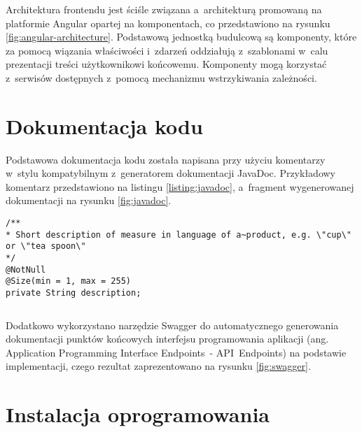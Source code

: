 
Architektura frontendu jest ściśle związana a~architekturą promowaną na platformie Angular opartej na komponentach,
co przedstawiono na rysunku \ref{fig:angular-architecture}.
Podstawową jednostką budulcową są komponenty, które za pomocą wiązania właściwości i~zdarzeń oddziałują z~szablonami w~calu prezentacji treści użytkownikowi końcowemu.
Komponenty mogą korzystać z~serwisów dostępnych z~pomocą mechanizmu wstrzykiwania zależności.

\section{Dokumentacja kodu}\label{sec:code-documentation}

Podstawowa dokumentacja kodu została napisana przy użyciu komentarzy w~stylu kompatybilnym z~generatorem dokumentacji JavaDoc\cite{tech:javadoc}.
Przykładowy komentarz przedstawiono na listingu \ref{listing:javadoc}, a~fragment wygenerowanej dokumentacji na rysunku \ref{fig:javadoc}.

\noindent\hspace{.075\textwidth}\begin{minipage}{.85\textwidth}
    \begin{verbatim}
/**
* Short description of measure in language of a~product, e.g. \"cup\" or \"tea spoon\"
*/
@NotNull
@Size(min = 1, max = 255)
private String description;
    \end{verbatim}
    \begin{lstlisting}[caption={Komentarz w~stylu JavaDoc \source{\ownwork}}, label={listing:javadoc}]
\end{lstlisting}
\end{minipage}


Dodatkowo wykorzystano narzędzie Swagger\cite{tech:swagger} do automatycznego generowania dokumentacji
punktów końcowych interfejsu programowania aplikacji (ang. Application Programming Interface Endpoints~- API~Endpoints) na podstawie implementacji,
czego rezultat zaprezentowano na rysunku \ref{fig:swagger}.


\section{Instalacja oprogramowania}\label{sec:software-installation}
